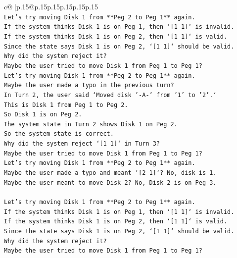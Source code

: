\documentclass{article}
\begin{document}
{\begin{supertabular}{c@{$\;$}|p{.15\linewidth}@{}p{.15\linewidth}p{.15\linewidth}p{.15\linewidth}p{.15\linewidth}p{.15\linewidth}}
{{{\\ 
\texttt{Let's try moving Disk 1 from **Peg 2 to Peg 1** again.} \\
\texttt{If the system thinks Disk 1 is on Peg 1, then `{[}1 1{]}` is invalid.} \\
\texttt{If the system thinks Disk 1 is on Peg 2, then `{[}1 1{]}` is valid.} \\
\texttt{Since the state says Disk 1 is on Peg 2, `{[}1 1{]}` should be valid.} \\
\texttt{Why did the system reject it?} \\
\texttt{Maybe the user tried to move Disk 1 from Peg 1 to Peg 1?} \\
\texttt{Let's try moving Disk 1 from **Peg 2 to Peg 1** again.} \\
\texttt{Maybe the user made a typo in the previous turn?} \\
\texttt{In Turn 2, the user said `Moved disk '{-}A{-}' from '1' to '2'.`} \\
\texttt{This is Disk 1 from Peg 1 to Peg 2.} \\
\texttt{So Disk 1 is on Peg 2.} \\
\texttt{The system state in Turn 2 shows Disk 1 on Peg 2.} \\
\texttt{So the system state is correct.} \\
\texttt{Why did the system reject `{[}1 1{]}` in Turn 3?} \\
\texttt{Maybe the user tried to move Disk 1 from Peg 1 to Peg 1?} \\
\texttt{Let's try moving Disk 1 from **Peg 2 to Peg 1** again.} \\
\texttt{Maybe the user made a typo and meant `{[}2 1{]}`? No, disk is 1.} \\
\texttt{Maybe the user meant to move Disk 2? No, Disk 2 is on Peg 3.} \\
\\ 
\texttt{Let's try moving Disk 1 from **Peg 2 to Peg 1** again.} \\
\texttt{If the system thinks Disk 1 is on Peg 1, then `{[}1 1{]}` is invalid.} \\
\texttt{If the system thinks Disk 1 is on Peg 2, then `{[}1 1{]}` is valid.} \\
\texttt{Since the state says Disk 1 is on Peg 2, `{[}1 1{]}` should be valid.} \\
\texttt{Why did the system reject it?} \\
\texttt{Maybe the user tried to move Disk 1 from Peg 1 to Peg 1?} \\
}}}
\end{supertabular}}
\end{document}
